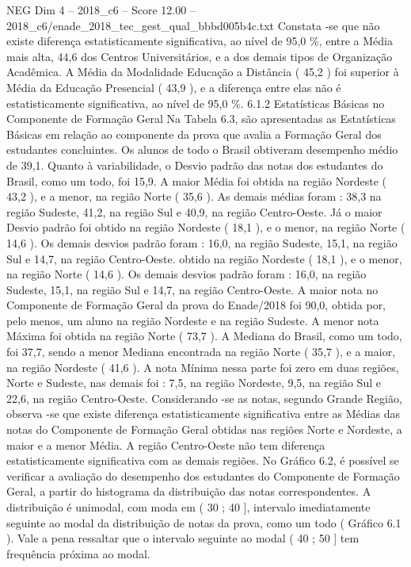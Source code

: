 \begin{textsample}{NEG Dim 4 – 2018\_c6 – Score 12.00 – 2018\_c6/enade\_2018\_tec\_gest\_qual\_bbbd005b4c.txt}
Constata -se que não existe diferença estatisticamente significativa, ao nível de 95,0 \%, entre a Média mais alta, 44,6 dos Centros Universitários, e a dos demais tipos de Organização Acadêmica.
A Média da Modalidade Educação a Distância ( 45,2 ) foi superior à Média da Educação Presencial ( 43,9 ), e a diferença entre elas não é estatisticamente significativa, ao nível de 95,0 \%. 6.1.2 Estatísticas Básicas no Componente de Formação Geral Na Tabela 6.3, são apresentadas as Estatísticas Básicas em relação ao componente da prova que avalia a Formação Geral dos estudantes concluintes.
Os alunos de todo o Brasil obtiveram desempenho médio de 39,1.
Quanto à variabilidade, o Desvio padrão das notas dos estudantes do Brasil, como um todo, foi 15,9.
A maior Média foi obtida na região Nordeste ( 43,2 ), e a menor, na região Norte ( 35,6 ).
As demais médias foram : 38,3 na região Sudeste, 41,2, na região Sul e 40,9, na região Centro-Oeste.
Já o maior Desvio padrão foi obtido na região Nordeste ( 18,1 ), e o menor, na região Norte ( 14,6 ).
Os demais desvios padrão foram : 16,0, na região Sudeste, 15,1, na região Sul e 14,7, na região Centro-Oeste. obtido na região Nordeste ( 18,1 ), e o menor, na região Norte ( 14,6 ).
Os demais desvios padrão foram : 16,0, na região Sudeste, 15,1, na região Sul e 14,7, na região Centro-Oeste.
A maior nota no Componente de Formação Geral da prova do Enade/2018 foi 90,0, obtida por, pelo menos, um aluno na região Nordeste e na região Sudeste.
A menor nota Máxima foi obtida na região Norte ( 73,7 ).
A Mediana do Brasil, como um todo, foi 37,7, sendo a menor Mediana encontrada na região Norte ( 35,7 ), e a maior, na região Nordeste ( 41,6 ).
A nota Mínima nessa parte foi zero em duas regiões, Norte e Sudeste, nas demais foi : 7,5, na região Nordeste, 9,5, na região Sul e 22,6, na região Centro-Oeste.
Considerando -se as notas, segundo Grande Região, observa -se que existe diferença estatisticamente significativa entre as Médias das notas do Componente de Formação Geral obtidas nas regiões Norte e Nordeste, a maior e a menor Média.
A região Centro-Oeste não tem diferença estatisticamente significativa com as demais regiões.
No Gráfico 6.2, é possível se verificar a avaliação do desempenho dos estudantes do Componente de Formação Geral, a partir do histograma da distribuição das notas correspondentes.
A distribuição é unimodal, com moda em ( 30 ; 40 ], intervalo imediatamente seguinte ao modal da distribuição de notas da prova, como um todo ( Gráfico 6.1 ).
Vale a pena ressaltar que o intervalo seguinte ao modal ( 40 ; 50 ] tem frequência próxima ao modal.

\end{textsample}
